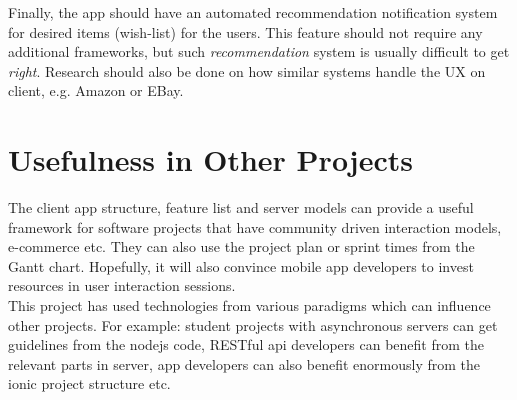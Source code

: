 Finally, the app should have an automated recommendation notification system for desired items (wish-list) for the users. This feature should not require any additional frameworks, but such \textit{recommendation} system is usually difficult to get \textit{right}. Research should also be done on how similar systems handle the UX on client, e.g. Amazon or EBay.

\section{Usefulness in Other Projects}

The client app structure, feature list and server models can provide a useful framework for software projects that have community driven interaction models, e-commerce etc. They can also use the project plan or sprint times from the Gantt chart. Hopefully, it will also convince mobile app developers to invest resources in user interaction sessions.\\

This project has used technologies from various paradigms which can influence other projects. For example: student projects with asynchronous servers can get guidelines from the nodejs code, RESTful api developers can benefit from the relevant parts in server, app developers can also benefit enormously from the ionic project structure etc.